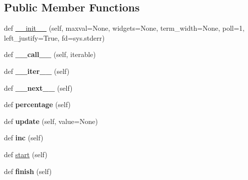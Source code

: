 \subsection*{Public Member Functions}
\begin{DoxyCompactItemize}
\item 
def \hyperlink{class_libraries_1_1_fast_progress_bar_1_1_progress_bar_a25c4be3e8e30b97b63ad468e087e0fcd}{\+\_\+\+\_\+init\+\_\+\+\_\+} (self, maxval=None, widgets=None, term\+\_\+width=None, poll=1, left\+\_\+justify=True, fd=sys.\+stderr)
\item 
def {\bfseries \+\_\+\+\_\+call\+\_\+\+\_\+} (self, iterable)\hypertarget{class_libraries_1_1_fast_progress_bar_1_1_progress_bar_afc9633e1de5aa501127c24f7ba3176ce}{}\label{class_libraries_1_1_fast_progress_bar_1_1_progress_bar_afc9633e1de5aa501127c24f7ba3176ce}

\item 
def {\bfseries \+\_\+\+\_\+iter\+\_\+\+\_\+} (self)\hypertarget{class_libraries_1_1_fast_progress_bar_1_1_progress_bar_ade5fcf9d37f820cf1efe11ab36a9440a}{}\label{class_libraries_1_1_fast_progress_bar_1_1_progress_bar_ade5fcf9d37f820cf1efe11ab36a9440a}

\item 
def {\bfseries \+\_\+\+\_\+next\+\_\+\+\_\+} (self)\hypertarget{class_libraries_1_1_fast_progress_bar_1_1_progress_bar_a4d66a650bd88130fc22589560b10eb60}{}\label{class_libraries_1_1_fast_progress_bar_1_1_progress_bar_a4d66a650bd88130fc22589560b10eb60}

\item 
def {\bfseries percentage} (self)\hypertarget{class_libraries_1_1_fast_progress_bar_1_1_progress_bar_ac4803294396801e32328e78a11caeb2c}{}\label{class_libraries_1_1_fast_progress_bar_1_1_progress_bar_ac4803294396801e32328e78a11caeb2c}

\item 
def {\bfseries update} (self, value=None)\hypertarget{class_libraries_1_1_fast_progress_bar_1_1_progress_bar_a4a2a185d0dda1287dd9e8dd2e6b4b8f9}{}\label{class_libraries_1_1_fast_progress_bar_1_1_progress_bar_a4a2a185d0dda1287dd9e8dd2e6b4b8f9}

\item 
def {\bfseries inc} (self)\hypertarget{class_libraries_1_1_fast_progress_bar_1_1_progress_bar_acc9b3156a0d0f008637cd66164ef9234}{}\label{class_libraries_1_1_fast_progress_bar_1_1_progress_bar_acc9b3156a0d0f008637cd66164ef9234}

\item 
def \hyperlink{class_libraries_1_1_fast_progress_bar_1_1_progress_bar_a67d0046745f8cdcd8602887c92690adf}{start} (self)
\item 
def {\bfseries finish} (self)\hypertarget{class_libraries_1_1_fast_progress_bar_1_1_progress_bar_af1a991c85d5b9a8aa3b501af96074271}{}\label{class_libraries_1_1_fast_progress_bar_1_1_progress_bar_af1a991c85d5b9a8aa3b501af96074271}

\end{DoxyCompactItemize}
